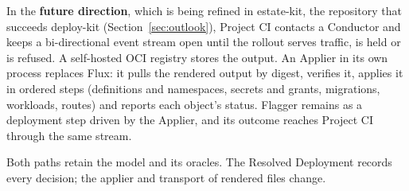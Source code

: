 In the \textbf{future direction}, which is being refined in estate-kit, the repository that
succeeds deploy-kit (Section~\ref{sec:outlook}), Project CI contacts a
Conductor and keeps a bi-directional event stream open until the rollout serves traffic, is held
or is refused. A self-hosted OCI registry stores the output. An Applier in its own
process replaces Flux: it pulls the rendered output by digest, verifies it, applies
it in ordered steps (definitions and namespaces, secrets and grants, migrations,
workloads, routes) and reports each object's status. Flagger remains as a deployment
step driven by the Applier, and its outcome reaches Project CI through the same stream.

Both paths retain the model and its oracles. The Resolved Deployment records
every decision; the applier and transport of rendered files change.

